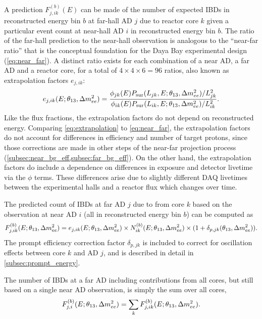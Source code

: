 A prediction $F_{j,ik}^{(b)}(E)$ can be made of the number of expected IBDs
in reconstructed energy bin $b$
at far-hall AD $j$ due to reactor core $k$
given a particular event count at near-hall AD $i$ in reconstructed energy bin $b$.
The ratio of the far-hall prediction to the near-hall observation
is analogous to the ``near-far ratio''
that is the conceptual foundation
for the Daya Bay experimental design (\cref{eq:near_far}).
A distinct ratio exists for each combination of a near AD, a far AD and a reactor core,
for a total of $4 \times 4 \times 6 = 96$ ratios, also known as extrapolation factors
$e_{j,ik}$:
\begin{equation}\label{eq:extrapolation}
    e_{j,ik}(E;\theta_{13},\Delta m^2_{ee}) = \frac{
        \phi_{jk}(E)P_\text{sur}(L_{jk}, E;\theta_{13},\Delta m^2_{ee})/L_{jk}^2}{
        \phi_{ik}(E)P_\text{sur}(L_{ik}, E;\theta_{13},\Delta m^2_{ee})/L_{ik}^2
    }.
\end{equation}
Like the flux fractions, the extrapolation factors
do not depend on reconstructed energy.
Comparing \cref{eq:extrapolation} to \cref{eq:near_far}, the extrapolation factors
do not account for differences in efficiency and number of target protons,
since those corrections are made in other steps of the near-far projection process
(\cref{subsec:near_bg_eff,subsec:far_bg_eff}).
On the other hand, the extrapolation factors do include a dependence on
differences in \nuebar{} exposure and detector livetime via the $\phi$ terms.
These differences arise due to slightly different DAQ livetimes
between the experimental halls
and a reactor flux which changes over time.

The predicted count of IBDs at far AD $j$ due to \nuebar{} from core $k$
based on the observation at near AD $i$ (all in reconstructed energy bin $b$) can be computed as
\begin{equation}\label{eq:far_true_core_pred}
    F_{j,ik}^{(b)}(E;\theta_{13},\Delta m^2_{ee}) = e_{j,ik}(E;\theta_{13},\Delta m^2_{ee}) \times
        N_{ik}^{(b)}(E;\theta_{13},\Delta m^2_{ee}) \times
        (1 + \delta_{p,jk}(\theta_{13}, \Delta m^2_{ee})).
\end{equation}
The prompt efficiency correction factor $\delta_{p,jk}$ is included
to correct for oscillation effects between core $k$ and AD $j$,
and is described in detail in \cref{subsec:prompt_energy}.

The number of IBDs at a far AD including contributions from all cores,
but still based on a single near AD observation,
is simply the sum over all cores,
\begin{equation}
    F_{j,i}^{(b)}(E;\theta_{13},\Delta m^2_{ee}) = \sum_k F_{j,ik}^{(b)}(E;\theta_{13},\Delta m^2_{ee}).
\end{equation}

